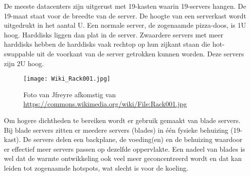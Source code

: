 De meeste datacenters zijn uitgerust met 19\inch-kasten waarin 19\inch-servers hangen. De 19\inch-maat staat voor de breedte van de server. De hoogte van een serverkast wordt uitgedrukt in het aantal U. Een normale server, de zogenaamde pizza-doos, is 1U hoog. Harddisks liggen dan plat in de server. Zwaardere servers met meer harddisks hebben de harddisks vaak rechtop op hun zijkant staan die hot-swappable uit de voorkant van de server getrokken kunnen worden. Deze servers zijn 2U hoog.

\begin{figure}[H]
\texttt{[image: Wiki\_Rack001.jpg]}
	\caption{Foto van Jfreyre afkomstig van \url{https://commons.wikimedia.org/wiki/File:Rack001.jpg}}
\centering
\end{figure}

Om hogere dichtheden te bereiken wordt er gebruik gemaakt van blade servers. Bij blade servers zitten er meedere servers (blades) in \'e\'en fysieke behuizing (19\inch-kast). De servers delen een backplane, de voeding(en) en de behuizing waardoor er effectief meer servers passen op dezelfde oppervlakte. Een nadeel van blades is wel dat de warmte ontwikkeling ook veel meer geconcentreerd wordt en dat kan leiden tot zogenaamde hotspots, wat slecht is voor de koeling.
